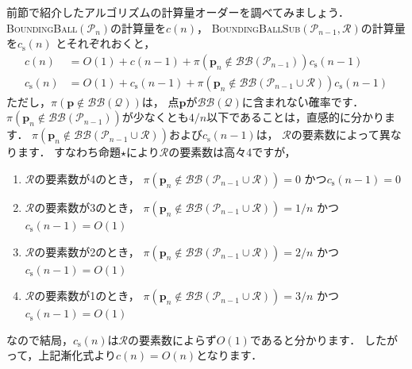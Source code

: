 ﻿\documentclass[a4paper]{jsarticle}
\begin{document}
前節で紹介したアルゴリズムの計算量オーダーを調べてみましょう．
\textsc{BoundingBall}$(\mathcal{P}_{n})$の計算量を$c(n)$，
\textsc{BoundingBallSub}$(\mathcal{P}_{n-1},\mathcal{R})$の計算量を$c_{\mathrm{s}}(n)$
とそれぞれおくと，
\begin{align*}
c(n)&=O(1)+c(n-1)+\pi(\boldsymbol{p}_{n}\notin\mathcal{BB}(\mathcal{P}_{n-1}))c_{\mathrm{s}}(n-1) \\
c_{\mathrm{s}}(n)&=O(1)+c_{\mathrm{s}}(n-1)+\pi(\boldsymbol{p}_{n}\notin\mathcal{BB}(\mathcal{P}_{n-1}\cup\mathcal{R}))c_{\mathrm{s}}(n-1)
\end{align*}
ただし，$\pi(\boldsymbol{p}\notin\mathcal{BB}(\mathcal{Q}))$は，
点$\boldsymbol{p}$が$\mathcal{BB}(\mathcal{Q})$に含まれ\.{な}\.{い}確率です．
$\pi(\boldsymbol{p}_{n}\notin\mathcal{BB}(\mathcal{P}_{n-1}))$が少なくとも$4/n$以下であることは，直感的に分かります．
$\pi(\boldsymbol{p}_{n}\notin\mathcal{BB}(\mathcal{P}_{n-1}\cup\mathcal{R}))$および$c_{\mathrm{s}}(n-1)$は，
$\mathcal{R}$の要素数によって異なります．
すなわち命題$\star$により$\mathcal{R}$の要素数は高々4ですが，
\begin{enumerate}
\item{$\mathcal{R}$の要素数が4のとき，
$\pi(\boldsymbol{p}_{n}\notin\mathcal{BB}(\mathcal{P}_{n-1}\cup\mathcal{R}))=0$
かつ$c_{\mathrm{s}}(n-1)=0$
}
\item{$\mathcal{R}$の要素数が3のとき，
$\pi(\boldsymbol{p}_{n}\notin\mathcal{BB}(\mathcal{P}_{n-1}\cup\mathcal{R}))=1/n$
かつ$c_{\mathrm{s}}(n-1)=O(1)$
}
\item{$\mathcal{R}$の要素数が2のとき，
$\pi(\boldsymbol{p}_{n}\notin\mathcal{BB}(\mathcal{P}_{n-1}\cup\mathcal{R}))=2/n$
かつ$c_{\mathrm{s}}(n-1)=O(1)$
}
\item{$\mathcal{R}$の要素数が1のとき，
$\pi(\boldsymbol{p}_{n}\notin\mathcal{BB}(\mathcal{P}_{n-1}\cup\mathcal{R}))=3/n$
かつ$c_{\mathrm{s}}(n-1)=O(1)$
}
\end{enumerate}
なので結局，$c_{\mathrm{s}}(n)$は$\mathcal{R}$の要素数によらず$O(1)$であると分かります．
したがって，上記漸化式より$c(n)=O(n)$となります．
\end{document}
